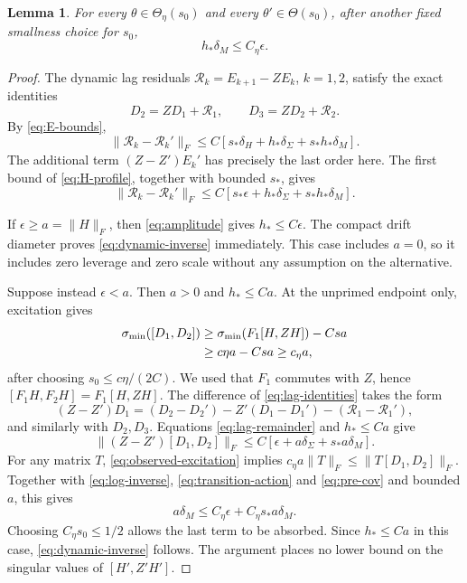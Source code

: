 \documentclass[11pt,a4paper]{amsart}
\theoremstyle{plain}
\newtheorem{lemma}[theorem]{Lemma}
\theoremstyle{definition}
\theoremstyle{remark}
\begin{document}
\begin{lemma}\label{lem:dynamic-inverse}
For every $\theta\in\Theta_\eta(s_0)$ and every
$\theta'\in\Theta(s_0)$, after another fixed smallness choice for $s_0$,
\begin{equation}\label{eq:dynamic-inverse}
 h_*\delta_M\le C_\eta\epsilon.
\end{equation}
\end{lemma}
\begin{proof}
The dynamic lag residuals
$\mathcal R_k=E_{k+1}-ZE_k$, $k=1,2$, satisfy the exact identities
\begin{equation}\label{eq:lag-identities}
 D_2=ZD_1+\mathcal R_1,\qquad D_3=ZD_2+\mathcal R_2.
\end{equation}
By \eqref{eq:E-bounds},
\[
 \|\mathcal R_k-\mathcal R_k'\|_F
 \le C[s_*\delta_H+h_*\delta_\Sigma+s_*h_*\delta_M].
\]
The additional term $(Z-Z')E_k'$ has precisely the last order here.
The first bound of \eqref{eq:H-profile}, together with bounded $s_*$, gives
\begin{equation}\label{eq:lag-remainder}
 \|\mathcal R_k-\mathcal R_k'\|_F
 \le C[s_*\epsilon+h_*\delta_\Sigma+s_*h_*\delta_M].
\end{equation}

If $\epsilon\ge a=\|H\|_F$, then \eqref{eq:amplitude} gives
$h_*\le C\epsilon$. The compact drift diameter proves
\eqref{eq:dynamic-inverse} immediately. This case includes $a=0$,
so it includes zero leverage and zero scale without any assumption on the
alternative.

Suppose instead $\epsilon<a$. Then $a>0$ and $h_*\le Ca$.
At the unprimed endpoint only, excitation gives
\begin{align}\label{eq:observed-excitation}
 \sigma_{\min}([D_1,D_2])
 &\ge\sigma_{\min}(F_1[H,ZH])-Csa\notag\\
 &\ge c\eta a-Csa\ge c_\eta a,
\end{align}
after choosing $s_0\le c\eta/(2C)$.
We used that $F_1$ commutes with $Z$, hence
$[F_1H,F_2H]=F_1[H,ZH]$. The difference of \eqref{eq:lag-identities}
takes the form
\[
 (Z-Z')D_1=(D_2-D_2')-Z'(D_1-D_1')
                         -(\mathcal R_1-\mathcal R_1'),
\]
and similarly with $D_2,D_3$. Equations \eqref{eq:lag-remainder} and
$h_*\le Ca$ give
\begin{equation}\label{eq:transition-action}
 \|(Z-Z')[D_1,D_2]\|_F
 \le C[\epsilon+a\delta_\Sigma+s_*a\delta_M].
\end{equation}
For any matrix $T$, \eqref{eq:observed-excitation} implies
$c_\eta a\|T\|_F\le\|T[D_1,D_2]\|_F$. Together with
\eqref{eq:log-inverse}, \eqref{eq:transition-action} and
\eqref{eq:pre-cov} and bounded $a$, this gives
\[
 a\delta_M\le C_\eta\epsilon+C_\eta s_*a\delta_M.
\]
Choosing $C_\eta s_0\le1/2$ allows the last term to be absorbed. Since
$h_*\le Ca$ in this case, \eqref{eq:dynamic-inverse} follows. The argument
places no lower bound on the singular values of $[H',Z'H']$.
\end{proof}
\end{document}
